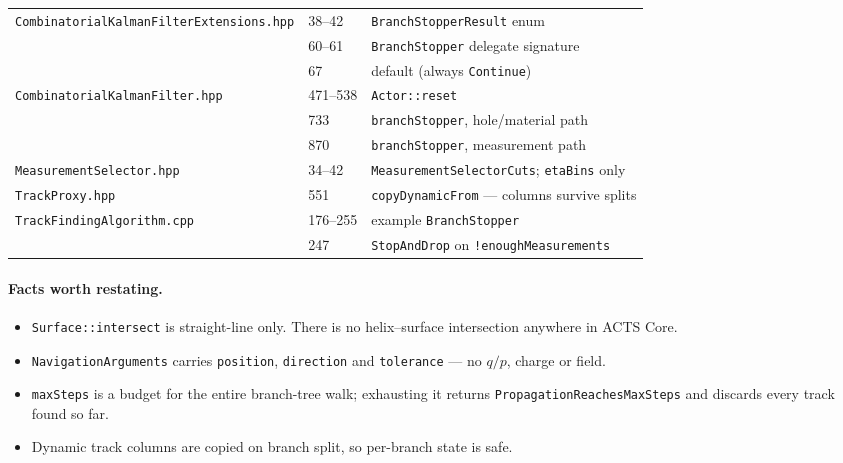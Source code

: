\documentclass[11pt,a4paper]{article}
\newcommand{\code}[1]{\texttt{\small #1}}
\begin{document}
\begin{table}[htbp]
\begin{tabular}{@{}llp{6.9cm}@{}}
\code{CombinatorialKalmanFilterExtensions.hpp} & 38--42 & \code{BranchStopperResult} enum \\
                        & 60--61  & \code{BranchStopper} delegate signature \\
                        & 67      & default (always \code{Continue}) \\
\code{CombinatorialKalmanFilter.hpp} & 471--538 & \code{Actor::reset} \\
                        & 733     & \code{branchStopper}, hole/material path \\
                        & 870     & \code{branchStopper}, measurement path \\
\code{MeasurementSelector.hpp} & 34--42 & \code{MeasurementSelectorCuts}; \code{etaBins} only \\
\code{TrackProxy.hpp}   & 551     & \code{copyDynamicFrom} --- columns survive splits \\
\code{TrackFindingAlgorithm.cpp} & 176--255 & example \code{BranchStopper} \\
                        & 247     & \code{StopAndDrop} on \code{!enoughMeasurements} \\
\bottomrule
\end{tabular}
\end{table}

\paragraph{Facts worth restating.}
\begin{itemize}
\item \code{Surface::intersect} is straight-line only. There is no
  helix--surface intersection anywhere in ACTS Core.
\item \code{NavigationArguments} carries \code{position}, \code{direction} and
  \code{tolerance} --- no $q/p$, charge or field.
\item \code{maxSteps} is a budget for the entire branch-tree walk; exhausting
  it returns \code{Propagation\allowbreak Reaches\allowbreak MaxSteps} and discards every track found
  so far.
\item Dynamic track columns are copied on branch split, so per-branch state is
  safe.
\end{itemize}
\end{document}

